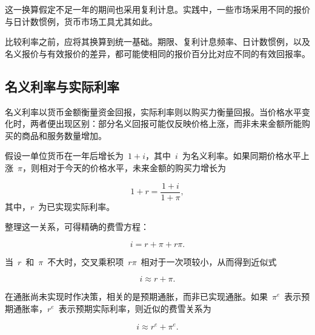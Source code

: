 这一换算假定不足一年的期间也采用复利计息。实践中，一些市场采用不同的报价与日计数惯例，货币市场工具尤其如此。

\begin{tcolorbox}[
enhanced,
breakable,
colback=white,
colframe=FinanceBlue,
boxrule=0.7pt,
sharp corners,
borderline west={2.2pt}{0pt}{FinanceBlue},
title=\textbf{金融视角：在可比基础上比较},
coltitle=white,
colbacktitle=FinanceBlue,
fonttitle=\bfseries,
before skip=1.2em,
after skip=1.2em
]

比较利率之前，应将其换算到统一基础。期限、复利计息频率、日计数惯例，以及名义报价与有效报价的差异，都可能使相同的报价百分比对应不同的有效回报率。

\end{tcolorbox}

\subsection{名义利率与实际利率}

名义利率以货币金额衡量资金回报，实际利率则以购买力衡量回报。当价格水平变化时，两者便出现区别：部分名义回报可能仅反映价格上涨，而非未来金额所能购买的商品和服务数量增加。

假设一单位货币在一年后增长为~$1+i$，其中~$i$~为名义利率。如果同期价格水平上涨~$\pi$，则相对于今天的价格水平，未来金额的购买力增长为

\begin{equation}
1+r
=
\frac{1+i}{1+\pi},
\label{eq:ch6-fisher-exact}
\end{equation}
其中，$r$~为已实现实际利率。

整理这一关系，可得精确的费雪方程：

\begin{equation}
i=r+\pi+r\pi.
\label{eq:ch6-fisher-expanded}
\end{equation}

当~$r$~和~$\pi$~不大时，交叉乘积项~$r\pi$~相对于一次项较小，从而得到近似式

\begin{equation}
i\approx r+\pi.
\label{eq:ch6-fisher-approx}
\end{equation}

在通胀尚未实现时作决策，相关的是预期通胀，而非已实现通胀。如果~$\pi^e$~表示预期通胀率，$r^e$~表示预期实际利率，则近似的费雪关系为

\begin{equation}
i\approx r^e+\pi^e.
\label{eq:ch6-fisher-expected}
\end{equation}

